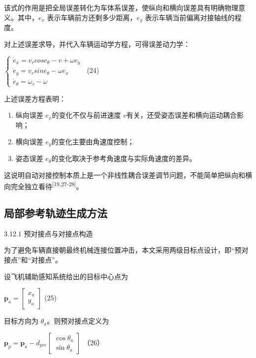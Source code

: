 该式的作用是把全局误差转化为车体系误差，使纵向和横向误差具有明确物理意义。其中，\(e_{x}\)
表示车辆前方还剩多少距离，\(e_{y}\) 表示车辆当前偏离对接轴线的程度。

对上述误差求导，并代入车辆运动学方程，可得误差动力学：

\(\left\{ \begin{array}{r}
{\dot{e}}_{x} = v_{r}cose_{\theta} - v + \omega e_{y} \\
{\dot{e}}_{y} = v_{r}sine_{\theta} - \omega e_{x} \\
{\dot{e}}_{\theta} = \omega_{r} - \omega
\end{array} \right.\ \) (24)

上述误差方程表明：

\begin{enumerate}
\def\labelenumi{\arabic{enumi}.}
\item
  纵向误差 \(e_{x}\)的变化不仅与前进速度
  \(v\)有关，还受姿态误差和横向运动耦合影响；
\item
  横向误差 \(e_{y}\)的变化主要由角速度控制；
\item
  姿态误差 \(e_{\theta}\)的变化取决于参考角速度与实际角速度的差异。
\end{enumerate}

这说明自动对接控制本质上是一个非线性耦合误差调节问题，不能简单把纵向和横向完全独立看待\textsuperscript{[19,27-28]}。

\subsection{局部参考轨迹生成方法}

3.12.1 预对接点与对接点构造

为了避免车辆直接朝最终机械连接位置冲击，本文采用两级目标点设计，即``预对接点''和``对接点''。

设飞机辅助感知系统给出的目标中心点为

\(\mathbf{p}_{a} = \left\lbrack \begin{array}{r}
x_{a} \\
y_{a}
\end{array} \right\rbrack\) (25)

目标方向为 \(\theta_{a}\)。则预对接点定义为

\(\mathbf{p}_{p} = \mathbf{p}_{a} - d_{pre}\left\lbrack \begin{array}{r}
\cos\theta_{a} \\
\sin\theta_{a}
\end{array} \right\rbrack\) （26）

